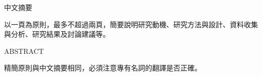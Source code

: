 \begin{center}
    {\LARGE{中文摘要}}
\end{center}
以一頁為原則，最多不超過兩頁，簡要說明研究動機、研究方法與設計、資料收集與分析、研究結果及討論建議等。

\newpage

\begin{center}
    {\LARGE ABSTRACT}
\end{center}
精簡原則與中文摘要相同，必須注意專有名詞的翻譯是否正確。

